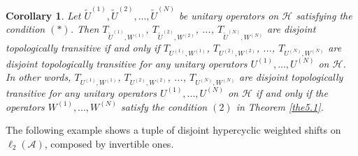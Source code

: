 \documentclass{article}
\newtheorem {corollary}[theorem]{Corollary}
\begin{document}
\begin{corollary}
Let $\tilde{U}^{(1)},\tilde{U}^{(2)}, ..., \tilde{U}^{(N)}$ be unitary operators on $\mathcal{H}$ satisfying the condition $(\ast)$. Then $T_{\tilde{U}^{(1)},W^{(1)}}$, $T_{\tilde{U}^{(2)},W^{(2)}}$, ..., $T_{\tilde{U}^{(N)},W^{(N)}}$ are disjoint topologically transitive if and only if $T_{U^{(1)},W^{(1)}}$, $T_{U^{(2)},W^{(2)}}$, ..., $T_{U^{(N)},W^{(N)}}$ are disjoint topologically transitive for any unitary operators $U^{(1)}, ..., U^{(N)}$ on $\mathcal{H}$. In other words, $T_{U^{(1)},W^{(1)}}$, $T_{U^{(2)},W^{(2)}}$, ..., $T_{U^{(N)},W^{(N)}}$ are disjoint topologically transitive for any unitary operators $U^{(1)}, ..., U^{(N)}$ on $\mathcal{H}$ if and only if the operators $W^{(1)}, ..., W^{(N)}$ satisfy the condition $(2)$ in Theorem \ref{the5.1}.
\end{corollary}

The following example shows a tuple of disjoint hypercyclic weighted shifts on $\ell_{2}(\mathcal{A})$, composed by invertible ones.
\end{document}
